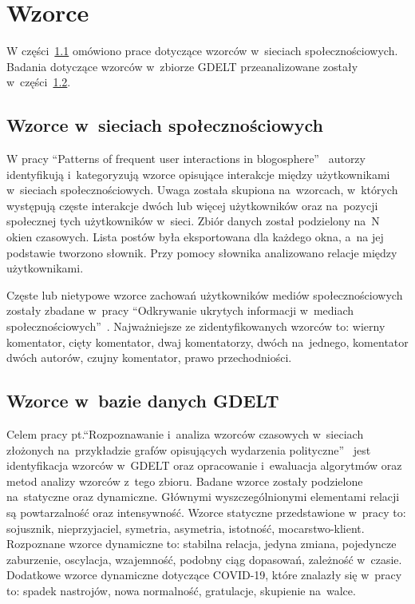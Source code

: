 \documentclass[11pt]{report}
\begin{document}
    \section{Wzorce}\label{sec:wzorce}
    W części~\ref{subsec:wzorce-w-sieciach-społecznościowych} omówiono prace dotyczące wzorców w~sieciach społecznościowych.
    Badania dotyczące wzorców w~zbiorze GDELT przeanalizowane zostały w~części~\ref{subsec:wzorce-gdelt}.

    \subsection{Wzorce w~sieciach społecznościowych}\label{subsec:wzorce-w-sieciach-społecznościowych}
    W pracy ``Patterns of frequent user interactions in blogosphere''~\cite{10.1093/jigpal/jzaa042} autorzy identyfikują i~kategoryzują wzorce opisujące interakcje między użytkownikami w~sieciach społecznościowych.
    Uwaga została skupiona na~wzorcach, w~których występują częste interakcje dwóch lub więcej użytkowników oraz na~pozycji społecznej tych użytkowników w~sieci.
    Zbiór danych został podzielony na~N okien czasowych.
    Lista postów była eksportowana dla każdego okna, a~na jej podstawie tworzono słownik.
    Przy pomocy słownika analizowano relacje między użytkownikami.

    Częste lub nietypowe wzorce zachowań użytkowników mediów społecznościowych
    zostały zbadane w~pracy ``Odkrywanie ukrytych informacji w~mediach społecznościowych''~\cite{Skwara2019}.
    Najważniejsze ze zidentyfikowanych wzorców to: wierny komentator, cięty komentator, dwaj komentatorzy, dwóch na~jednego, komentator dwóch autorów, czujny komentator, prawo przechodniości.

    \subsection{Wzorce w~bazie danych GDELT}\label{subsec:wzorce-gdelt}
    Celem pracy pt.\@ ``Rozpoznawanie i~analiza wzorców czasowych w~sieciach złożonych na~przykładzie grafów opisujących wydarzenia polityczne''~\cite{Jarosz2020}
    jest identyfikacja wzorców w~GDELT oraz opracowanie i~ewaluacja algorytmów oraz metod analizy wzorców z~tego zbioru.
    Badane wzorce zostały podzielone na~statyczne oraz dynamiczne.
    Głównymi wyszczególnionymi elementami relacji są powtarzalność oraz intensywność.
    Wzorce statyczne przedstawione w~pracy to: sojusznik, nieprzyjaciel, symetria, asymetria, istotność, mocarstwo-klient.
    Rozpoznane wzorce dynamiczne to: stabilna relacja, jedyna zmiana, pojedyncze zaburzenie, oscylacja, wzajemność, podobny ciąg dopasowań, zależność w~czasie.
    Dodatkowe wzorce dynamiczne dotyczące COVID-19, które znalazły się w~pracy to: spadek nastrojów, nowa normalność, gratulacje, skupienie na~walce.
\end{document}
